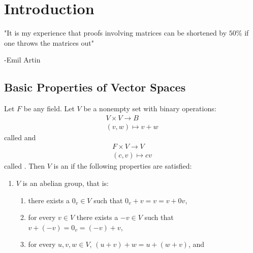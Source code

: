\chapter{Introduction}\label{chapter:introduction}

\vspace{12pt}
"It is my experience that proofs involving matrices can be shortened by $50\%$ if one throws the matrices out"

\quad\quad\quad\quad\quad\quad\quad\quad\quad\quad\quad\quad\quad\quad\quad\quad\quad\quad\quad\quad\quad\quad\quad\quad\quad\quad\quad\quad\quad\quad\quad\quad\quad -Emil Artin
\section{Basic Properties of Vector Spaces}
    \begin{definition}
        Let $F$ be any field. Let $V$ be a nonempty set with binary operations:
            \begin{equation*}
            \begin{split}
                V \times V \rightarrow B \\
                (v,w) \mapsto v+w
            \end{split}
            \end{equation*}
        called  and
            \begin{equation*}
            \begin{split}
                F \times V \rightarrow V \\
                (c,v) \mapsto cv
            \end{split}
            \end{equation*}
        called . Then $V$ is an  if the following properties are satisfied:
            \begin{enumerate}[label = (\arabic*)]
                \item $V$ is an abelian group, that is:
                    \begin{enumerate}[label = (\roman*)]
                        \item there exists a $0_v \in V$ such that $0_v + v = v = v + 0v$,
                        \item for every $v \in V$ there exists a $-v \in V$ such that $v+(-v) = 0_v = (-v) + v$,
                        \item for every $u,v,w \in V$, $(u+v) + w = u + (w+v)$, and

\end{enumerate}
\end{enumerate}
\end{definition}

